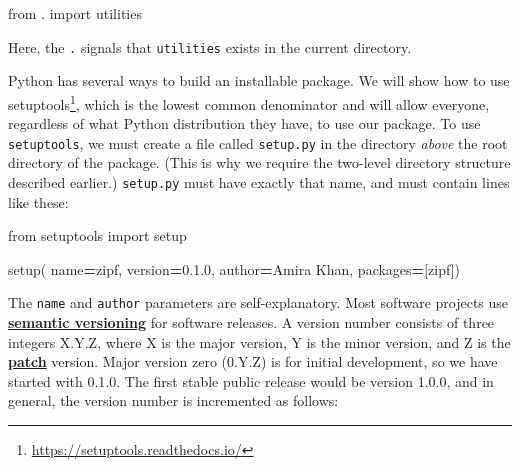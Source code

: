 \documentclass[
]{krantz}
\makeatletter
\newenvironment{Shaded}{\begin{snugshade}}{\end{snugshade}}
\newcommand{\ImportTok}[1]{#1}
\newcommand{\NormalTok}[1]{#1}
\newcommand{\OperatorTok}[1]{\textcolor[rgb]{0.81,0.36,0.00}{\textbf{#1}}}
\newcommand{\StringTok}[1]{\textcolor[rgb]{0.31,0.60,0.02}{#1}}
\renewcommand{\href}[2]{#2\footnote{\url{#1}}}
\newenvironment{kframe}{%
\medskip{}
\setlength{\fboxsep}{.8em}
 \def\at@end@of@kframe{}%
 \ifinner\ifhmode%
  \def\at@end@of@kframe{\end{minipage}}%
  \begin{minipage}{\columnwidth}%
 \fi\fi%
 \def\FrameCommand##1{\hskip\@totalleftmargin \hskip-\fboxsep
 \colorbox{shadecolor}{##1}\hskip-\fboxsep
     \hskip-\linewidth \hskip-\@totalleftmargin \hskip\columnwidth}%
 \MakeFramed {\advance\hsize-\width
   \@totalleftmargin\z@ \linewidth\hsize
   \@setminipage}}%
 {\par\unskip\endMakeFramed%
 \at@end@of@kframe}
\renewenvironment{Shaded}{\begin{kframe}}{\end{kframe}}
\newcommand{\gref}[2]{\hyperlink{#2}{\textbf{#1}}}
\makeatother
\begin{document}
\begin{Shaded}
\begin{Highlighting}[]
\ImportTok{from}\NormalTok{ . }\ImportTok{import}\NormalTok{ utilities}
\end{Highlighting}
\end{Shaded}

Here,
the \texttt{.} signals that \texttt{utilities} exists in the current directory.

Python has several ways to build an installable package.
We will show how to use \href{https://setuptools.readthedocs.io/}{setuptools},
which is the lowest common denominator
and will allow everyone,
regardless of what Python distribution they have,
to use our package.
To use \texttt{setuptools},
we must create a file called \texttt{setup.py} in the directory \emph{above} the root directory of the package.
(This is why we require the two-level directory structure described earlier.)
\texttt{setup.py} must have exactly that name,
and must contain lines like these:

\begin{Shaded}
\begin{Highlighting}[]
\ImportTok{from}\NormalTok{ setuptools }\ImportTok{import}\NormalTok{ setup}


\NormalTok{setup(}
\NormalTok{    name}\OperatorTok{=}\StringTok{\textquotesingle{}zipf\textquotesingle{}}\NormalTok{,}
\NormalTok{    version}\OperatorTok{=}\StringTok{\textquotesingle{}0.1.0\textquotesingle{}}\NormalTok{,}
\NormalTok{    author}\OperatorTok{=}\StringTok{\textquotesingle{}Amira Khan\textquotesingle{}}\NormalTok{,}
\NormalTok{    packages}\OperatorTok{=}\NormalTok{[}\StringTok{\textquotesingle{}zipf\textquotesingle{}}\NormalTok{])}
\end{Highlighting}
\end{Shaded}

The \texttt{name} and \texttt{author} parameters are self-explanatory.
Most software projects use \gref{semantic versioning}{semantic\_versioning}
for software releases.
A version number consists of three integers X.Y.Z,
where X is the major version,
Y is the minor version,
and Z is the \gref{patch}{patch} version.
Major version zero (0.Y.Z) is for initial development, so we have started with 0.1.0.
The first stable public release would be version 1.0.0,
and in general, the version number is incremented as follows:
\end{document}
